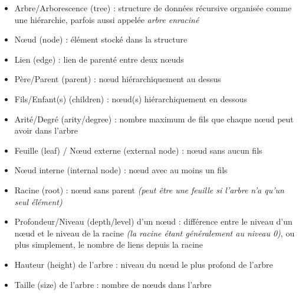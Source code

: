 \documentclass[11pt,a4paper]{article}
\begin{document}
\begin{itemize}
\item Arbre/Arborescence (tree) : structure de données récursive organisée comme une hiérarchie, parfois aussi appelée \textit{arbre enraciné}
\item Nœud (node) : élément stocké dans la structure
\item Lien (edge) : lien de parenté entre deux nœuds

\bigskip

\item Père/Parent (parent) : nœud hiérarchiquement au dessus
\item Fils/Enfant(s) (children) : nœud(s) hiérarchiquement en dessous
\item Arité/Degré (arity/degree) : nombre maximum de fils que chaque nœud peut avoir dans l'arbre

\bigskip

\item Feuille (leaf) / Nœud externe (external node) : nœud sans aucun fils
\item Nœud interne (internal node) : nœud avec au moins un fils
\item Racine (root) : nœud sans parent \textit{(peut être une feuille si l'arbre n'a qu'un seul élément)}

\bigskip

\item Profondeur/Niveau (depth/level) d'un nœud : différence entre le niveau d'un nœud et le niveau de la racine \textit{(la racine étant généralement au niveau 0)}, ou plus simplement, le nombre de liens depuis la racine
\item Hauteur (height) de l'arbre : niveau du nœud le plus profond de l'arbre
\item Taille (size) de l'arbre : nombre de nœuds dans l'arbre
\end{itemize}


\end{document}
